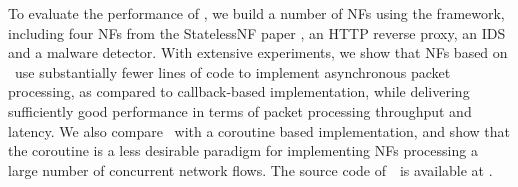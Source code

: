 


To evaluate the performance of \netstar, we build a number of NFs using the framework, including four NFs from the StatelessNF paper \cite{201545}, an HTTP reverse proxy, an IDS and a malware detector. %
With extensive experiments, we show that NFs based on \netstar~use substantially fewer lines of code to implement asynchronous packet processing, as compared to callback-based implementation, while delivering sufficiently good performance in terms of packet processing throughput and latency. We also compare \netstar~with a coroutine based implementation, and show that the coroutine is a less desirable paradigm for implementing NFs processing a large number of concurrent network flows. The source code of~\netstar~is available at \cite{netstar-source}.


